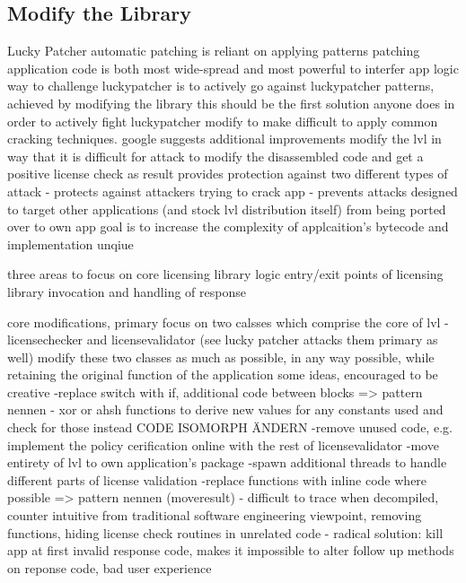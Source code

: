 \subsection{Modify the Library} \label{subsection:counter-modifications-library}


Lucky Patcher automatic patching is reliant on applying patterns
patching application code is both most wide-spread and most powerful to interfer app logic\cite{munteanLicense}
way to challenge luckypatcher is to actively go against luckypatcher patterns, achieved by modifying the library \cite{munteanLicense}
this should be the first solution anyone does in order to actively fight luckypatcher
modify to make difficult to apply common cracking techniques. \cite{developersSecuring}
google suggests additional improvements \cite{developersSecuring}
modify the \gls{lvl} in way that it is difficult for attack to modify the disassembled code and get a positive license check as result \cite{developersSecuring}
provides protection against two different types of attack \cite{developersSecuring}
- protects against attackers trying to crack app \cite{developersSecuring}
- prevents attacks designed to target other applications (and stock lvl distribution itself) from being ported over to own app \cite{developersSecuring}
goal is to increase the complexity of applcaition's bytecode and implementation unqiue \cite{developersSecuring}

three areas to focus on \cite{developersSecuring}
core licensing library logic \cite{developersSecuring}
entry/exit points of licensing library \cite{developersSecuring}
invocation and handling of response \cite{developersSecuring}

core modifications, primary focus on two calsses which comprise the core of \gls{lvl} - licensechecker and licensevalidator (see lucky patcher attacks them primary as well) \cite{developersSecuring}
modify these two classes as much as possible, in any way possible, while retaining the original function of the application \cite{developersSecuring}
some ideas, encouraged to be creative \cite{developersSecuring}
-replace switch with if, additional code between blocks => pattern nennen \cite{developersSecuring}
- xor or ahsh functions to derive new values for any constants used and check for those instead CODE ISOMORPH ÄNDERN\cite{developersSecuring}
-remove unused code, e.g. implement the policy cerification online with the rest of licensevalidator \cite{developersSecuring}
-move entirety of \gls{lvl} to own application's package \cite{developersSecuring}
-spawn additional threads to handle different parts of license validation \cite{developersSecuring}
-replace functions with inline code where possible => pattern nennen (moveresult) \cite{developersSecuring}
- difficult to trace when decompiled, counter intuitive from traditional software engineering viewpoint, removing functions, hiding license check routines in unrelated code\cite{developersSecuring}
- radical solution: kill app at first invalid response code, makes it impossible to alter follow up methods on reponse code, bad user experience

